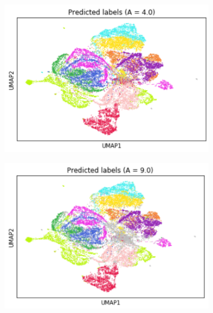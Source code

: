 \documentclass{article}
\begin{document}
\begin{figure}
    \begin{subfigure}[t]{0.30\textwidth}
    \centering
        \includegraphics[width=\linewidth]{figs/notMNIST/notMNIST_preds_Aeq4.png} 
    \end{subfigure}
    \begin{subfigure}[t]{0.30\textwidth}
        \centering
        \includegraphics[width=\linewidth]{figs/notMNIST/notMNIST_preds_Aeq9.png} 
    \end{subfigure}
    \begin{subfigure}[t]{0.34\textwidth}
        \centering

\end{subfigure}
\end{figure}
\end{document}
